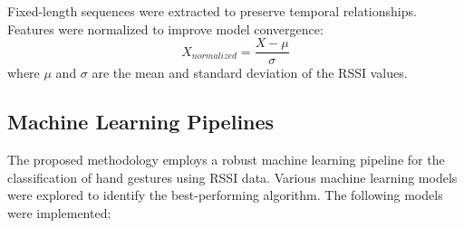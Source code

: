 \documentclass[10pt,twocolumn,letterpaper]{article}
\begin{document}
Fixed-length sequences were extracted to preserve temporal relationships. Features were normalized to improve model convergence:
\begin{equation}
    X_{normalized} = \frac{X - \mu}{\sigma}
\end{equation}
where \( \mu \) and \( \sigma \) are the mean and standard deviation of the RSSI values.

\subsection{Machine Learning Pipelines}

The proposed methodology employs a robust machine learning pipeline for the classification of hand gestures using RSSI data. Various machine learning models were explored to identify the best-performing algorithm. The following models were implemented:
\end{document}
